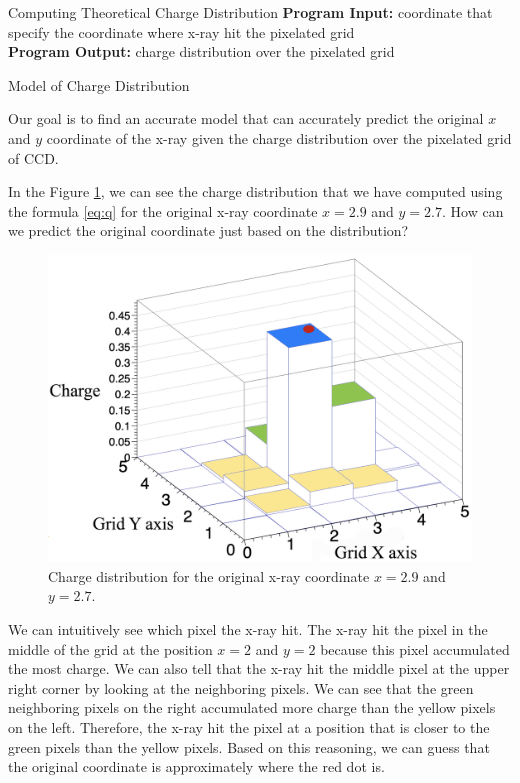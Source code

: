 \documentclass[final]{beamer}
\newlength{\colwidth}
\begin{document}
\begin{frame}[t]
\begin{columns}[t]
\begin{column}{\colwidth}
\begin{block}{Computing Theoretical Charge Distribution}
    \textbf{Program Input:} coordinate that specify the coordinate where x-ray hit the pixelated grid\\
    \textbf{Program Output: } charge distribution over the pixelated grid

  \end{block}

  \begin{block}{Model of Charge Distribution}

    Our goal is to find an accurate model that can accurately predict the original $x$ and $y$ coordinate of the x-ray given the charge distribution over the pixelated grid of CCD.


    In the Figure \ref{fig:charge}, we can see the charge distribution that we have computed using the formula \ref{eq:q} for the original x-ray coordinate $x=2.9$ and $y=2.7$. How can we predict the original coordinate just based on the distribution?
    
    \begin{figure}[H]
        \centering
        \includegraphics[width=0.7\linewidth]{images/charge_distribution.png}
        \caption{Charge distribution for the original x-ray coordinate $x=2.9$ and $y=2.7$.}
        \label{fig:charge}
    \end{figure}

    We can intuitively see which pixel the x-ray hit. The x-ray hit the pixel in the middle of the grid at the position $x=2$ and $y=2$ because this pixel accumulated the most charge. We can also tell that the x-ray hit the middle pixel at the upper right corner by looking at the neighboring pixels. We can see that the green neighboring pixels on the right accumulated more charge than the yellow pixels on the left. Therefore, the x-ray hit the pixel at a position that is closer to the green pixels than the yellow pixels. Based on this reasoning, we can guess that the original coordinate is approximately where the red dot is.


\end{block}
\end{column}
\end{columns}
\end{frame}
\end{document}
